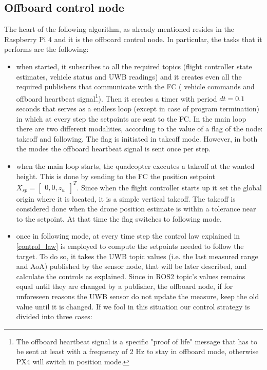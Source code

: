 \subsection{Offboard control node}
The heart of the following algorithm, as already mentioned resides in the Raspberry Pi 4 and it is the offboard control node. In particular, the tasks that it performs are the following: 
\begin{itemize}
    \item when started, it subscribes to all the required topics (flight controller state estimates, vehicle status and UWB readings) and it creates even all the required publishers that communicate with the FC ( vehicle commands and offboard heartbeat signal\footnote{The offboard heartbeat signal is a specific "proof of life" message that has to be sent at least with a frequency of 2 Hz to stay in offboard mode, otherwise PX4 will switch in position mode.}). Then it creates a timer with period $dt=0.1$ seconds that serves as a endless loop (except in case of program termination) in which at every step the setpoints are sent to the FC. In the main loop there are two different modalities, according to the value of a flag of the node: takeoff and following. The flag is initiated in takeoff mode. However, in both the modes the offboard heartbeat signal is sent once per step.
    \item when the main loop starts, the quadcopter executes a takeoff at the wanted height. This is done by sending to the FC the position setpoint $X_{sp}=\begin{bmatrix} 0,0,z_{w} \end{bmatrix}^T$. Since when the flight controller starts up it set the global origin where it is located, it is a simple vertical takeoff. The takeoff is considered done when the drone position estimate is within a tolerance near to the setpoint. At that time the flag switches to following mode.
    \item once in following mode, at every time step the control law explained in \autoref{control_law} is employed to compute the setpoints needed to follow the target. To do so, it takes the UWB topic values (i.e. the last measured range and AoA) published by the sensor node, that will be later described, and calculate the controls as explained.
    Since in ROS2 topic's values remains equal until they are changed by a publisher, the offboard node, if for unforeseen reasons the UWB sensor do not update the measure, keep the old value until it is changed. If we fool in this situation our control strategy is divided into three cases:

\end{itemize}
